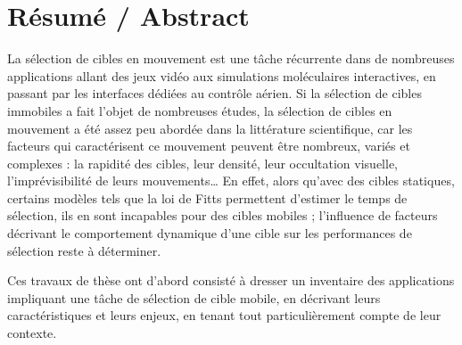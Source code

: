 
\chapter*{Résumé / Abstract}%

\mtcaddchapter %

%

\pagestyle{plain}

	La sélection de cibles en mouvement est une tâche récurrente dans de nombreuses applications allant des jeux vidéo aux simulations moléculaires interactives, en passant par les interfaces dédiées au contrôle aérien. Si la sélection de cibles immobiles a fait l'objet de nombreuses études, la sélection de cibles en mouvement a été assez peu abordée dans la littérature scientifique, car les facteurs qui caractérisent ce mouvement peuvent être nombreux, variés et complexes : la rapidité des cibles, leur densité, leur occultation visuelle, l'imprévisibilité de leurs mouvements\ldots{} En effet, alors qu’avec des cibles statiques, certains modèles tels que la loi de Fitts permettent d’estimer le temps de sélection, ils en sont incapables pour des cibles mobiles ; l'influence de facteurs décrivant le comportement dynamique d'une cible sur les performances de sélection reste à déterminer.

	Ces travaux de thèse ont d'abord consisté à dresser un inventaire des applications impliquant une tâche de sélection de cible mobile, en décrivant leurs caractéristiques et leurs enjeux, en tenant tout particulièrement compte de leur contexte.
	
